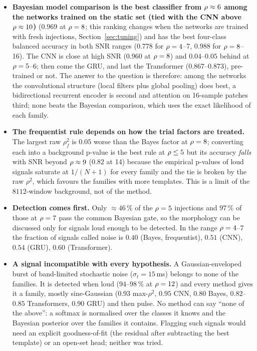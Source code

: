 \begin{itemize}[nosep]
\item \textbf{Bayesian model comparison is the best classifier from $\rho\approx6$ among the networks trained on the static set (tied with the CNN above $\rho\approx10$)} ($0.969$ at $\rho=8$; this ranking changes when the networks are trained with fresh injections, Section~\ref{sec:tuning}) and has the best four-class balanced accuracy in both SNR ranges ($0.778$ for $\rho=4$--7, $0.988$ for $\rho=8$--16). The CNN is close at high SNR ($0.960$ at $\rho=8$) and $0.04$--$0.05$ behind at $\rho=5$--6; then come the GRU, and last the Transformer ($0.867$--$0.873$), pre-trained or not. The answer to the question is therefore: among the networks the convolutional structure (local filters plus global pooling) does best, a bidirectional recurrent encoder is second and attention on 16-sample patches third; none beats the Bayesian comparison, which uses the exact likelihood of each family.
\item \textbf{The frequentist rule depends on how the trial factors are treated.} The largest raw $\rho^2_f$ is $0.05$ worse than the Bayes factor at $\rho=8$; converting each into a background p-value is the best rule at $\rho\le5$ but its accuracy \emph{falls} with SNR beyond $\rho\approx9$ ($0.82$ at 14) because the empirical p-values of loud signals saturate at $1/(N+1)$ for every family and the tie is broken by the raw $\rho^2$, which favours the families with more templates. This is a limit of the $8112$-window background, not of the method.
\item \textbf{Detection comes first.} Only $\approx46\,\%$ of the $\rho=5$ injections and $97\,\%$ of those at $\rho=7$ pass the common Bayesian gate, so the morphology can be discussed only for signals loud enough to be detected. In the range $\rho=4$--7 the fraction of signals called noise is $0.40$ (Bayes, frequentist), $0.51$ (CNN), $0.54$ (GRU), $0.60$ (Transformer).
\item \textbf{A signal incompatible with every hypothesis.} A Gaussian-enveloped burst of band-limited stochastic noise ($\sigma_t=15$\,ms) belongs to none of the families. It is detected when loud ($94$--$98\,\%$ at $\rho=12$) and every method gives it a family, mostly sine-Gaussian ($0.93$ max-$\rho^2$, $0.95$ CNN, $0.80$ Bayes, $0.82$--$0.85$ Transformers, $0.90$ GRU) and then pulse. No method can say ``none of the above'': a softmax is normalised over the classes it knows and the Bayesian posterior over the families it contains. Flagging such signals would need an explicit goodness-of-fit (the residual after subtracting the best template) or an open-set head; neither was tried.
\end{itemize}

